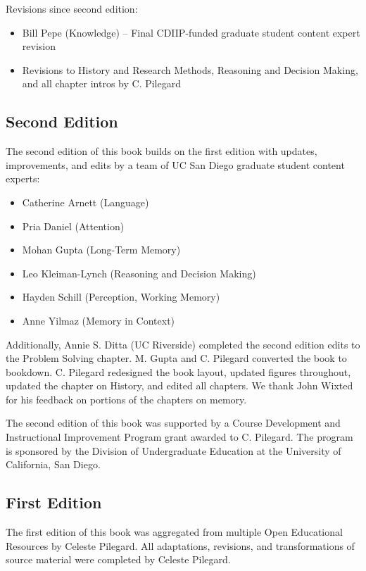 \documentclass[
]{krantz}
\providecommand{\tightlist}{%
  \setlength{\itemsep}{0pt}\setlength{\parskip}{0pt}}
\begin{document}
Revisions since second edition:

\begin{itemize}
\tightlist
\item
  Bill Pepe (Knowledge) -- Final CDIIP-funded graduate student content expert revision
\item
  Revisions to History and Research Methods, Reasoning and Decision Making, and all chapter intros by C. Pilegard
\end{itemize}

\subsection*{Second Edition}\label{second-edition}


The second edition of this book builds on the first edition with updates, improvements, and edits by a team of UC San Diego graduate student content experts:

\begin{itemize}
\tightlist
\item
  Catherine Arnett (Language)
\item
  Pria Daniel (Attention)
\item
  Mohan Gupta (Long-Term Memory)
\item
  Leo Kleiman-Lynch (Reasoning and Decision Making)
\item
  Hayden Schill (Perception, Working Memory)
\item
  Anne Yilmaz (Memory in Context)
\end{itemize}

Additionally, Annie S. Ditta (UC Riverside) completed the second edition edits to the Problem Solving chapter. M. Gupta and C. Pilegard converted the book to bookdown. C. Pilegard redesigned the book layout, updated figures throughout, updated the chapter on History, and edited all chapters. We thank John Wixted for his feedback on portions of the chapters on memory.

The second edition of this book was supported by a Course Development and Instructional Improvement Program grant awarded to C. Pilegard. The program is sponsored by the Division of Undergraduate Education at the University of California, San Diego.

\subsection*{First Edition}\label{first-edition}


The first edition of this book was aggregated from multiple Open Educational Resources by Celeste Pilegard. All adaptations, revisions, and transformations of source material were completed by Celeste Pilegard.
\end{document}
